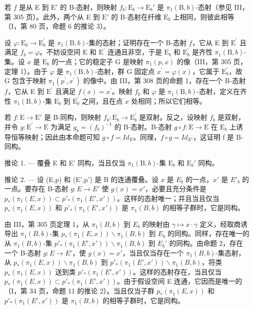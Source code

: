 若 \(f\) 是从 E 到 \(\mathrm{E}'\) 的 B-态射，则映射 \(f_b\colon \mathrm{E}_b\to \mathrm{E}_b'\) 是 \(\pi_1(\mathrm{B},b)\)-态射（参见 III，第 305 页）。此外，两个从 E 到 \(\mathrm{E}'\) 的 B-态射在纤维 \(\mathrm{E}_b\) 上相同，则彼此相等（I，第 80 页，命题 6 的推论 3）。

设 \(\varphi\colon\mathrm{E}_{b}\to\mathrm{E}_{b}^{\prime}\) 是 \(\pi_{1}(\mathrm{B},b)\)-集的态射；证明存在一个 B-态射 \(f\)，它从 E 到 \(\mathrm{E}^{\prime}\) 且满足 \(f_{b}=\varphi\)。不妨设空间 E 和 \(\mathrm{E}^{\prime}\) 连通且非空，于是 \(\mathrm{E}_{b}\) 和 \(\mathrm{E}_{b}^{\prime}\) 是齐性 \(\pi_{1}(\mathrm{B},b)\)-集。设 \(x\) 是 \(\mathrm{E}_{b}\) 的一点；它的稳定子 G 是映射 \(\pi_{1}(p,x)\) 的像（III，第 305 页，定理 1）。由于 \(\varphi\) 是 \(\pi_{1}(\mathrm{B},b)\)-态射，群 G 固定点 \(x^{\prime}=\varphi(x)\)，它属于 \(\mathrm{E}_{b}^{\prime}\)，故 G 包含于映射 \(\pi_{1}(p^{\prime},x^{\prime})\) 的像中。由 III，第 308 页的命题 1，存在一个 B-态射 \(f\)，它从 E 到 \(\mathrm{E}^{\prime}\) 且满足 \(f(x)=x^{\prime}\)。映射 \(f_{b}\) 和 \(\varphi\) 是 \(\pi_{1}(\mathrm{B},b)\)-态射，定义在齐性 \(\pi_{1}(\mathrm{B},b)\)-集 \(\mathrm{E}_{b}\) 到 \(\mathrm{E}_{b}^{\prime}\) 之间，且在点 \(x\) 处相同；所以它们相等。

若 \(f\colon \mathrm{E}\to \mathrm{E}'\) 是 B-同构，则映射 \(f_{b}\colon \mathrm{E}_{b}\to \mathrm{E}_{b}^{\prime}\) 是双射。反之，设映射 \(f_{b}\) 是双射，并令 \(g\colon \mathrm{E}^{\prime}\to \mathrm{E}\) 为满足 \(g_{b} = (f_{b})^{-1}\) 的 B-态射。B-态射 \(g\circ f\colon \mathrm{E}\to \mathrm{E}\) 在 \(\mathrm{E}_b\) 上诱导恒等映射；因此由本命题可知 \(g \circ f = Id_{E}\)。同理，\(f \circ g = Id_{E'}\)，这证明 f 是 B-同构。

推论 1. --- 覆叠 E 和 E' 同构，当且仅当 \(\pi_1(\mathrm{B},b)\)-集 \(\mathrm{E}_b\) 和 \(\mathrm{E}_b'\) 同构。

推论 2. --- 设 (E,p) 和 (E',p') 是 B 的连通覆叠。设 \(x\) 是 \(E_{b}\) 的一点，\(x'\) 是 \(E'_{b}\) 的一点。要存在 B-态射 \(g\colon E\to E'\) 使 \(g(x)=x'\)，必要且充分条件是 \(p_{*}(\pi_{1}(E,x))\subset p'_{*}(\pi_{1}(E',x'))\)。这样的态射唯一；并且当且仅当 \(p_{*}(\pi_{1}(E,x))\) 和 \(p'_{*}(\pi_{1}(E',x'))\) 是 \(\pi_{1}(B,b)\) 的相等子群时，它是同构。

由 III，第 305 页定理 1，从 \(\pi_1(B,b)\) 到 \(E_b\) 的映射由 \(\gamma \mapsto x \cdot \gamma\) 定义，经取商诱导出 \(\pi_1(B,b)\)-集 \(p_*(\pi_1(E,x)) \backslash \pi_1(B,b)\) 到 \(E_b\) 的同构。同样，存在唯一的从 \(\pi_1(B,b)\)-集 \(p'_{*}(\pi_1(E',x')) \backslash \pi_1(B,b)\) 到 \(E_b'\) 的同构。由命题 2，存在一个 B-态射 \(g\colon E\to E'\)，使 \(g(x)=x'\)，当且仅当存在一个 \(\pi_1(B,b)\)-集态射，从 \(p_*(\pi_1(E,x)) \backslash \pi_1(B,b)\) 到 \(p'_{*}(\pi_1(E',x')) \backslash \pi_1(B,b)\)，将类 \(p_*(\pi_1(E,x))\) 送到类 \(p'_{*}(\pi_1(E',x'))\)。这样的态射存在，当且仅当 \(p_*(\pi_1(E,x)) \subset p'_{*}(\pi_1(E',x'))\)。由于假设空间 E 连通，它因而是唯一的（I，第 34 页，命题 11 的推论 2）。当且仅当子群 \(p_*(\pi_1(E,x))\) 和 \(p'_{*}(\pi_1(E',x'))\) 是 \(\pi_1(B,b)\) 的相等子群时，它是同构。

